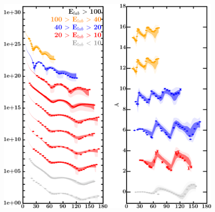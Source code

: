 \documentclass[twocolumn,secnumarabic,amssymb, nobibnotes, aps, prl,
superscriptaddress, nobalancelastpage]{revtex4}
\begin{document}
\begin{figure}[!htb]
    \centering
    \begin{minipage}{0.4\linewidth}
        \centering
        \includegraphics[width=\linewidth]{figures/ni64_protonElastic.png}
        \label{DOM_ni64_proton_elastic}
    \end{minipage}\hspace{6pt}
    \begin{minipage}{0.4\linewidth}
        \centering

\end{minipage}
\end{figure}
\end{document}
